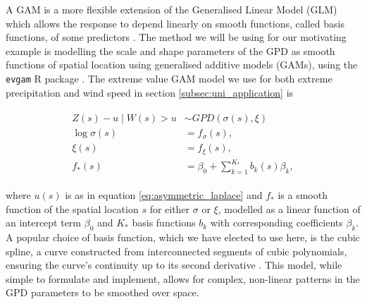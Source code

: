 \documentclass{article}
\numberwithin{equation}{section}
\begin{document}
A GAM is a more flexible extension of the Generalised Linear Model (GLM) which allows the response to depend linearly on smooth functions, called basis functions, of some predictors \cite{Wood2006}.
The method we will be using for our motivating example is modelling the scale and shape parameters of the GPD as smooth functions of spatial location using generalised additive models (GAMs), using the \texttt{evgam} R package \cite{Youngman2022}.
The extreme value GAM model we use for both extreme precipitation and wind speed in section \ref{subsec:uni_application} is
\begin{center}
  \begin{align} \label{eq:gpd_gam}
    \begin{split}
      Z(s) - u \mid W(s) > u &\sim GPD(\sigma(s), \xi) \\
      \log{\sigma(s)} &= f_{\sigma}(s), \\
              \xi(s) &= f_{\xi}(s), \\
              f_*(s) &= \beta_0 + \sum_{k=1}^{K_*}b_k(s)\beta_k,
    \end{split}
  \end{align}
\end{center}
where $u(s)$ is as in equation \ref{eq:asymmetric_laplace} and $f_*$ is a smooth function of the spatial location $s$ for either $\sigma$ or $\xi$, modelled as a linear function of an intercept term $\beta_0$ and $K_*$ basis functions $b_k$ with corresponding coefficients $\beta_k$. 
A popular choice of basis function, which we have elected to use here, is the cubic spline, a curve constructed from interconnected segments of cubic polynomials, ensuring the curve's continuity up to its second derivative \cite{Wood2006}. 
This model, while simple to formulate and implement, allows for complex, non-linear patterns in the GPD parameters to be smoothed over space.
\end{document}
